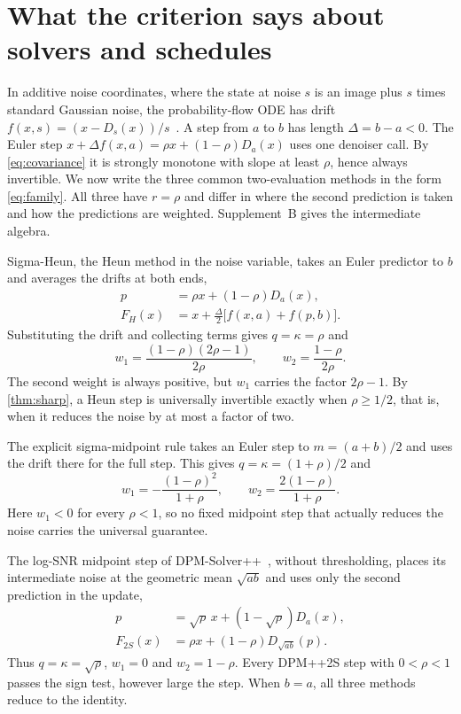 \section{What the criterion says about solvers and schedules}
\label{sec:solvers}
In additive noise coordinates, where the state at noise $s$ is an image plus $s$ times standard Gaussian noise, the probability-flow ODE has drift $f(x,s)=(x-D_s(x))/s$~\cite{songsde2021,karras2022}. A step from $a$ to $b$ has length $\Delta=b-a<0$. The Euler step $x+\Delta f(x,a)=\rho x+(1-\rho)D_a(x)$ uses one denoiser call. By \cref{eq:covariance} it is strongly monotone with slope at least $\rho$, hence always invertible. We now write the three common two-evaluation methods in the form \cref{eq:family}. All three have $r=\rho$ and differ in where the second prediction is taken and how the predictions are weighted. Supplement~B gives the intermediate algebra.

Sigma-Heun, the Heun method in the noise variable, takes an Euler predictor to $b$ and averages the drifts at both ends,
\begin{align}
 p&=\rho x+(1-\rho)D_a(x),\nonumber\\
 F_H(x)&=x+\tfrac{\Delta}{2}\bigl[f(x,a)+f(p,b)\bigr].
 \label{eq:heun}
\end{align}
Substituting the drift and collecting terms gives $q=\kappa=\rho$ and
\begin{equation}
 w_1=\frac{(1-\rho)(2\rho-1)}{2\rho},\qquad w_2=\frac{1-\rho}{2\rho}.
 \label{eq:heunweights}
\end{equation}
The second weight is always positive, but $w_1$ carries the factor $2\rho-1$. By \cref{thm:sharp}, a Heun step is universally invertible exactly when $\rho\ge1/2$, that is, when it reduces the noise by at most a factor of two.

The explicit sigma-midpoint rule takes an Euler step to $m=(a+b)/2$ and uses the drift there for the full step. This gives $q=\kappa=(1+\rho)/2$ and
\begin{equation}
 w_1=-\frac{(1-\rho)^2}{1+\rho},\qquad w_2=\frac{2(1-\rho)}{1+\rho}.
 \label{eq:midweights}
\end{equation}
Here $w_1<0$ for every $\rho<1$, so no fixed midpoint step that actually reduces the noise carries the universal guarantee.

The log-SNR midpoint step of DPM-Solver++~\cite{lu2022}, without thresholding, places its intermediate noise at the geometric mean $\sqrt{ab}$ and uses only the second prediction in the update,
\begin{align}
 p&=\sqrt\rho\,x+(1-\sqrt\rho)D_a(x),\nonumber\\
 F_{2S}(x)&=\rho x+(1-\rho)D_{\sqrt{ab}}(p).
 \label{eq:dpm}
\end{align}
Thus $q=\kappa=\sqrt\rho$, $w_1=0$ and $w_2=1-\rho$. Every DPM++2S step with $0<\rho<1$ passes the sign test, however large the step. When $b=a$, all three methods reduce to the identity.

